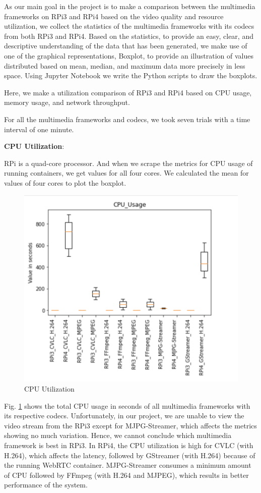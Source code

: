 As our main goal in the project is to make a comparison between the multimedia frameworks on RPi3 and RPi4 based on the video quality and resource utilization, we collect the statistics of the multimedia frameworks with its codecs from both RPi3 and RPi4. Based on the statistics, to provide an easy, clear, and descriptive understanding of the data that has been generated, we make use of one of the graphical representations, Boxplot, to provide an illustration of values distributed based on mean, median, and maximum data more precisely in less space. Using Jupyter Notebook we write the Python scripts to draw the boxplots. \par

Here, we make a utilization comparison of RPi3 and RPi4 based on CPU usage, memory usage, and network throughput. \par

For all the multimedia frameworks and codecs, we took seven trials with a time interval of one minute. \par

\textbf{CPU Utilization}:

RPi is a quad-core processor. And when we scrape the metrics for CPU usage of running containers, we get values for all four cores. We calculated the mean for values of four cores to plot the boxplot.

\begin{figure}[H]
	\centering
	\includegraphics[width=.8\textwidth, trim=4 4 4 4,clip]{images/Boxplots/CPU_Usage.png}
	\caption{CPU Utilization}
	\label{fig:cpu_usage}
\end{figure}

Fig. \ref{fig:cpu_usage} shows the total CPU usage in seconds of all multimedia frameworks with its respective codecs. Unfortunately, in our project, we are unable to view the video stream from the RPi3 except for MJPG-Streamer, which affects the metrics showing no much variation. Hence, we cannot conclude which multimedia framework is best in RPi3. In RPi4, the CPU utilization is high for CVLC (with H.264), which affects the latency, followed by GStreamer (with H.264) because of the running WebRTC container. MJPG-Streamer consumes a minimum amount of CPU followed by FFmpeg (with H.264 and MJPEG), which results in better performance of the system.
  
